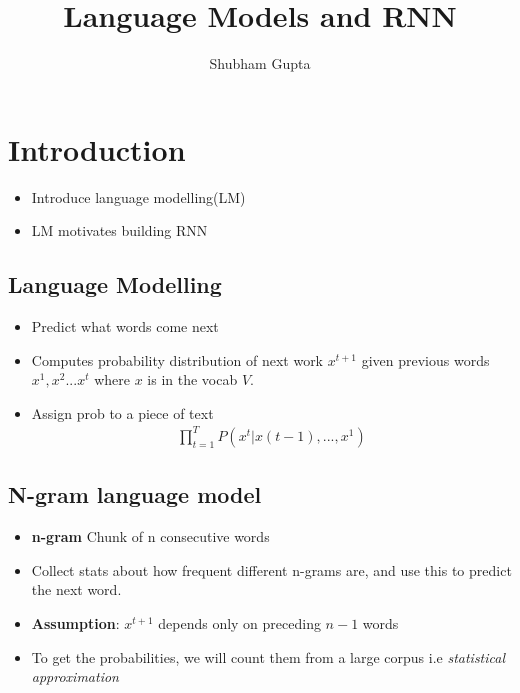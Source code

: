 \documentclass[a4paper]{article}
\title{Language Models and RNN}
\author{Shubham Gupta}
\begin{document}
\maketitle
\section{Introduction}
\begin{itemize}
    \item Introduce language modelling(LM)
    \item LM motivates building RNN
\end{itemize}
\subsection{Language Modelling}
\begin{itemize}
    \item Predict what words come next
    \item Computes probability distribution of next work $x^{t+1}$ given previous words $x^1,x^2...x^t$  where $x$ is in the vocab $V$.
    \item Assign prob to a piece of text
    \begin{equation}
    \begin{split}
        \prod_{t=1}^{T} P(x^t | x(t-1),...,x^1)
    \end{split}
    \end{equation}
\end{itemize}
\subsection{N-gram language model}
\begin{itemize}
    \item \textbf{n-gram} Chunk of n consecutive words 
    \item Collect stats about how frequent different n-grams are, and use this to predict the next word.
    \item \textbf{Assumption}: $x^{t+1}$ depends only on preceding $n-1$ words 
    \item To get the probabilities, we will count them from a large corpus i.e \textit{statistical approximation} 
\end{itemize}
\end{document}
